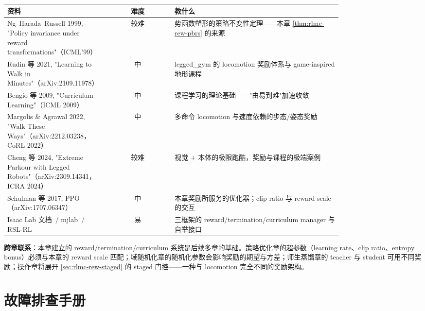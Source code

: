 \begin{center}
\small
\begin{tabular}{@{}p{0.30\linewidth}cp{0.50\linewidth}@{}}
\toprule
资料 & 难度 & 教什么 \\
\midrule
Ng--Harada--Russell 1999, "Policy invariance under reward transformations"（ICML'99）\,\cite{ng1999shaping} & 较难 & 势函数塑形的策略不变性定理——本章 \cref{thm:rlmc-rew-pbrs} 的来源 \\
Rudin 等 2021, "Learning to Walk in Minutes"（arXiv:2109.11978）\,\cite{rudin2021minutes} & 中 & legged\_gym 的 locomotion 奖励体系与 game-inspired 地形课程 \\
Bengio 等 2009, "Curriculum Learning"（ICML 2009）\,\cite{bengio2009curriculum} & 中 & 课程学习的理论基础——"由易到难"加速收敛 \\
Margolis \& Agrawal 2022, "Walk These Ways"（arXiv:2212.03238，CoRL 2022）\,\cite{margolis2022walk} & 中 & 多命令 locomotion 与速度依赖的步态/姿态奖励 \\
Cheng 等 2024, "Extreme Parkour with Legged Robots"（arXiv:2309.14341，ICRA 2024）\,\cite{cheng2024parkour} & 较难 & 视觉 $+$ 本体的极限跑酷，奖励与课程的极端案例 \\
Schulman 等 2017, PPO（arXiv:1707.06347）\,\cite{schulman2017ppo} & 中 & 本章奖励所服务的优化器；clip ratio 与 reward scale 的交互 \\
Isaac Lab 文档\,\cite{isaaclab2024} / mjlab\,\cite{mjlab2026} / RSL-RL\,\cite{schwarke2025rslrl} & 易 & 三框架的 reward/termination/curriculum manager 与自举接口 \\
\bottomrule
\end{tabular}
\end{center}

\textbf{跨章联系}：本章建立的 reward/termination/curriculum 系统是后续多章的基础。策略优化章的超参数（learning rate、clip ratio、entropy bonus）必须与本章的 reward scale 匹配；域随机化章的随机化参数会影响奖励的期望与方差；师生蒸馏章的 teacher 与 student 可用不同奖励；操作章将展开 \cref{sec:rlmc-rew-staged} 的 staged 门控——一种与 locomotion 完全不同的奖励架构。

\section*{故障排查手册}
\label{sec:rlmc-rew-trouble}

